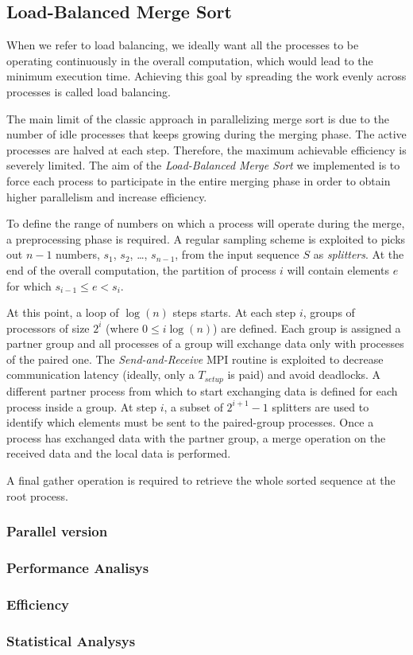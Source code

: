 \subsection{Load-Balanced Merge Sort}
When we refer to load balancing, we ideally want all the processes to be operating continuously in the overall computation, which would lead to the minimum execution time. Achieving this goal by spreading the work evenly across processes is called load balancing.

The main limit of the classic approach in parallelizing merge sort is due to the number of idle processes that keeps growing during the merging phase. The active processes are halved at each step. Therefore, the maximum achievable efficiency is severely limited. The aim of the \textit{Load-Balanced Merge Sort} we implemented is to force each process to participate in the entire merging phase in order to obtain higher parallelism and increase efficiency.

To define the range of numbers on which a process will operate during the merge, a preprocessing phase is required. A regular sampling scheme is exploited to picks out $n-1$ numbers, $s_1$, $s_2$, \dots, $s_{n-1}$, from the input sequence $S$ as \textit{splitters}. At the end of the overall computation, the partition of process $i$ will contain elements $e$ for which $s_{i-1} \leq e < s_i$.

At this point, a loop of $\log (n)$ steps starts. At each step $i$, groups of processors of size $2^i$ (where $0 \leq i \log(n)$) are defined. Each group is assigned a partner group and all processes of a group will exchange data only with processes of the paired one. The \textit{Send-and-Receive} MPI routine is exploited to decrease communication latency (ideally, only a $T_{setup}$ is paid) and avoid deadlocks. A different partner process from which to start exchanging data is defined for each process inside a group. At step $i$, a subset of $2^{i+1}-1$ splitters are used to identify which elements must be sent to the paired-group processes. Once a process has exchanged data with the partner group, a merge operation on the received data and the local data is performed.

A final gather operation is required to retrieve the whole sorted sequence at the root process.



\subsubsection*{Parallel version}
\subsubsection*{Performance Analisys} 
\subsubsection*{Efficiency} 
\subsubsection*{Statistical Analysys}